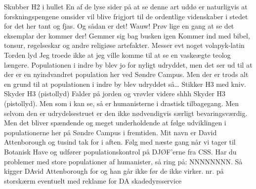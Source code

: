 \documentclass[a4paper,11pt]{article}
\begin{document}
\begin{sketch}
 Skubber H2 i hullet
 En af de lyse sider på at se denne art uddø er naturligvis at forskningspengene omsider vil blive frigjort til de ordentlige videnskaber i stedet for det her tant og fjas.
Og sådan er det! Wauw! Prøv lige en gang at se det eksemplar der kommer der!
 Gemmer sig bag busken igen
 Kommer ind med bibel, tonsur, røgelseskar og andre religiøse artefakter. Messer evt noget volapyk-latin
\scene Torden lyd
 Jeg troede ikke at jeg ville komme til at se en vaskeægte teolog længere. Populationen i indre by blev jo for nyligt udryddet, men det ser ud til at der er en nyindvandret population her ved Søndre Campus. Men der er trods alt en grund til at populationen i indre by blev udryddet så…
 Stikker H3 med kniv. Skyder H3 (pistollyd)
 Falder på jorden og vrøvler videre
 shhh  Skyder H3 (pistollyd). 
 Men som i kan se, så er humanisterne i drastisk tilbagegang. Men selvom den er udrydelsestruet er den ikke nødvendigvis særligt bevaringsværdig. Men det bliver spændende og meget underholdende at følge udviklingen i populationerne her på Søndre Campus i fremtiden. Mit navn er David Attenborough og tusind tak for i aften.  
 Følg med næste gang når vi tager til Botanisk Have og udfører populationskontrol på DJØF’erne fra CSS. Har du problemer med store populationer af humanister, så ring på: NNNNNNNN. Så kigger DAvid Attenborough for og han går ikke før de ikke virker. 
\scene nr. på storskærm eventuelt med reklame for DA skadedyrsservice
\end{sketch}
\end{document}
